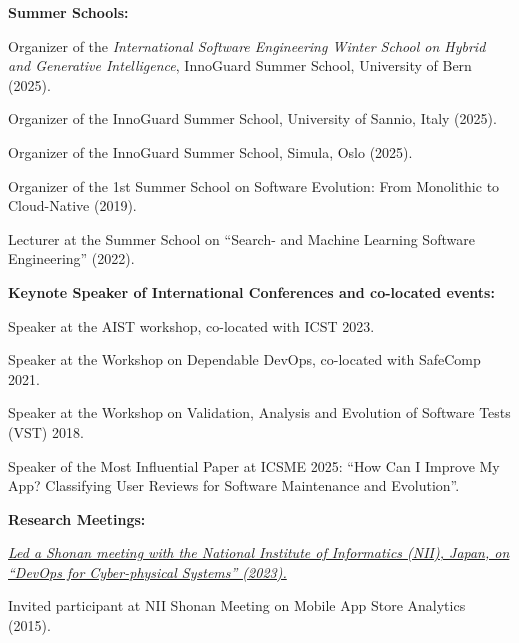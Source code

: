 \documentclass[11pt]{article}
\begin{document}
\medskip 

\textbf{Summer Schools:}
\begin{innerlist}
\item Organizer of the \textit{International Software Engineering Winter School on Hybrid and Generative Intelligence}, InnoGuard Summer School, University of Bern (2025).
\item Organizer of the InnoGuard Summer School, University of Sannio, Italy (2025).
\item Organizer of the InnoGuard Summer School, Simula, Oslo (2025).
\item Organizer of the 1st Summer School on Software Evolution: From Monolithic to Cloud-Native (2019).
\item Lecturer at the Summer School on ``Search- and Machine Learning Software Engineering'' (2022).
\end{innerlist}

\medskip 

\textbf{Keynote Speaker of International Conferences and co-located events:}
\begin{innerlist}
\item Speaker at the AIST workshop, co-located with ICST 2023.
\item Speaker at the Workshop on Dependable DevOps, co-located with SafeComp 2021.
\item Speaker at the Workshop on Validation, Analysis and Evolution of Software Tests (VST) 2018.
\item Speaker of the Most Influential Paper at ICSME 2025: ``How Can I Improve My App? Classifying User Reviews for Software Maintenance and Evolution''.
\end{innerlist}

\medskip 

\textbf{Research Meetings:}
\begin{innerlist}
   \item \emph{\href{https://shonan.nii.ac.jp/seminars/204/}{Led a Shonan meeting with the National Institute of Informatics (NII), Japan, on ``DevOps for Cyber-physical Systems'' (2023).}}
   \item Invited participant at NII Shonan Meeting on Mobile App Store Analytics (2015).
\end{innerlist}

\medskip\medskip\medskip
\end{document}
